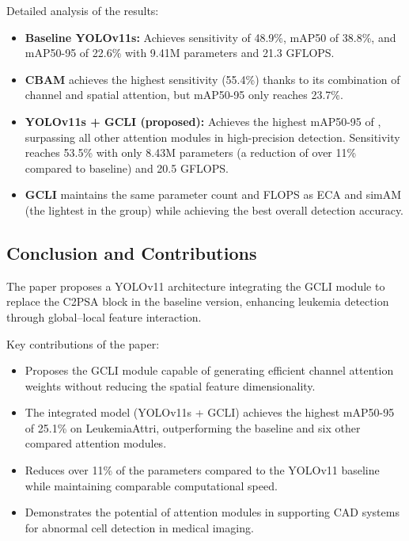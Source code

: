 Detailed analysis of the results:
\begin{itemize}
    \item \textbf{Baseline YOLOv11s:} Achieves sensitivity of 48.9\%, mAP50 of 38.8\%, and mAP50-95 of 22.6\% with 9.41M parameters and 21.3 GFLOPS.
    \item \textbf{CBAM} achieves the highest sensitivity (55.4\%) thanks to its combination of channel and spatial attention, but mAP50-95 only reaches 23.7\%.
    \item \textbf{YOLOv11s + GCLI (proposed):} Achieves the highest mAP50-95 of , surpassing all other attention modules in high-precision detection. Sensitivity reaches 53.5\% with only 8.43M parameters (a reduction of over 11\% compared to baseline) and 20.5 GFLOPS.
    \item \textbf{GCLI} maintains the same parameter count and FLOPS as ECA and simAM (the lightest in the group) while achieving the best overall detection accuracy.
\end{itemize}

\subsection{Conclusion and Contributions}
The paper proposes a YOLOv11 architecture integrating the GCLI module to replace the C2PSA block in the baseline version, enhancing leukemia detection through global--local feature interaction.

Key contributions of the paper:
\begin{itemize}
    \item Proposes the GCLI module capable of generating efficient channel attention weights without reducing the spatial feature dimensionality.
    \item The integrated model (YOLOv11s + GCLI) achieves the highest mAP50-95 of 25.1\% on LeukemiaAttri, outperforming the baseline and six other compared attention modules.
    \item Reduces over 11\% of the parameters compared to the YOLOv11 baseline while maintaining comparable computational speed.
    \item Demonstrates the potential of attention modules in supporting CAD systems for abnormal cell detection in medical imaging.
\end{itemize}
